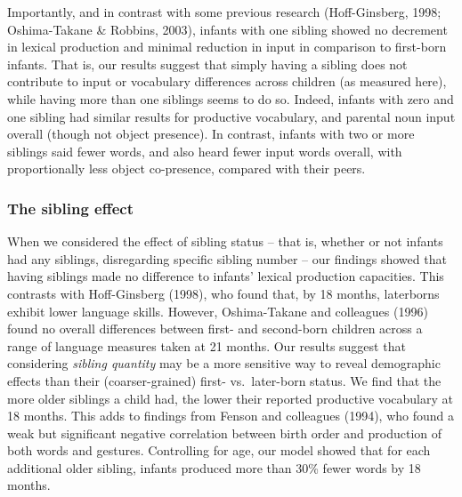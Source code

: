 \documentclass[
  man,mask,floatsintext]{apa6}
\begin{document}
Importantly, and in contrast with some previous research (Hoff-Ginsberg, 1998; Oshima-Takane \& Robbins, 2003), infants with one sibling showed no decrement in lexical production and minimal reduction in input in comparison to first-born infants. That is, our results suggest that simply having a sibling does not contribute to input or vocabulary differences across children (as measured here), while having more than one siblings seems to do so. Indeed, infants with zero and one sibling had similar results for productive vocabulary, and parental noun input overall (though not object presence). In contrast, infants with two or more siblings said fewer words, and also heard fewer input words overall, with proportionally less object co-presence, compared with their peers.

\hypertarget{the-sibling-effect}{%
\subsubsection{The sibling effect}\label{the-sibling-effect}}

When we considered the effect of sibling status -- that is, whether or not infants had any siblings, disregarding specific sibling number -- our findings showed that having siblings made no difference to infants' lexical production capacities. This contrasts with Hoff-Ginsberg (1998), who found that, by 18 months, laterborns exhibit lower language skills. However, Oshima-Takane and colleagues (1996) found no overall differences between first- and second-born children across a range of language measures taken at 21 months. Our results suggest that considering \emph{sibling quantity} may be a more sensitive way to reveal demographic effects than their (coarser-grained) first- vs.~later-born status. We find that the more older siblings a child had, the lower their reported productive vocabulary at 18 months. This adds to findings from Fenson and colleagues (1994), who found a weak but significant negative correlation between birth order and production of both words and gestures. Controlling for age, our model showed that for each additional older sibling, infants produced more than 30\% fewer words by 18 months.
\end{document}
